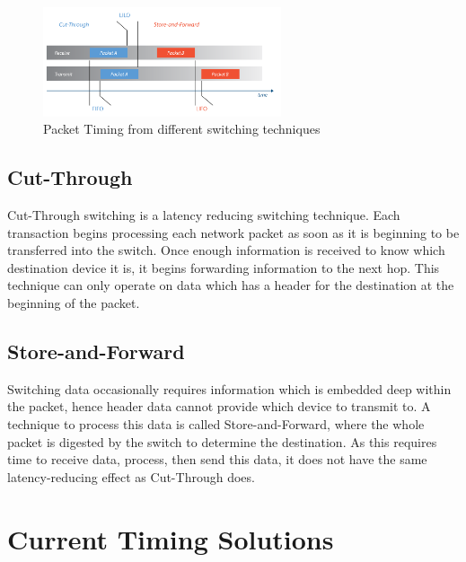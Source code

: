 \begin{figure}[H]
        \begin{center}
                    \includegraphics[width=7cm,keepaspectratio]{Images/SwitchingTechniques.png}
                            \caption{Packet Timing from different switching techniques \cite{latencyinethernet}}
                                    \label{fig:PacketTiming}
                                        \end{center}
\end{figure}

\subsection{Cut-Through}

\par Cut-Through switching is a latency reducing switching technique. 
Each transaction begins processing each network packet as soon as it is beginning to be transferred into the switch.
Once enough information is received to know which destination device it is, it begins forwarding information to the next hop.
This technique can only operate on data which has a header for the destination at the beginning of the packet.

\subsection{Store-and-Forward}

\par Switching data occasionally requires information which is embedded deep within the packet, hence header data cannot provide which device to transmit to.
A technique to process this data is called Store-and-Forward, where the whole packet is digested by the switch to determine the destination.
As this requires time to receive data, process, then send this data, it does not have the same latency-reducing effect as Cut-Through does.

\section{Current Timing Solutions}

